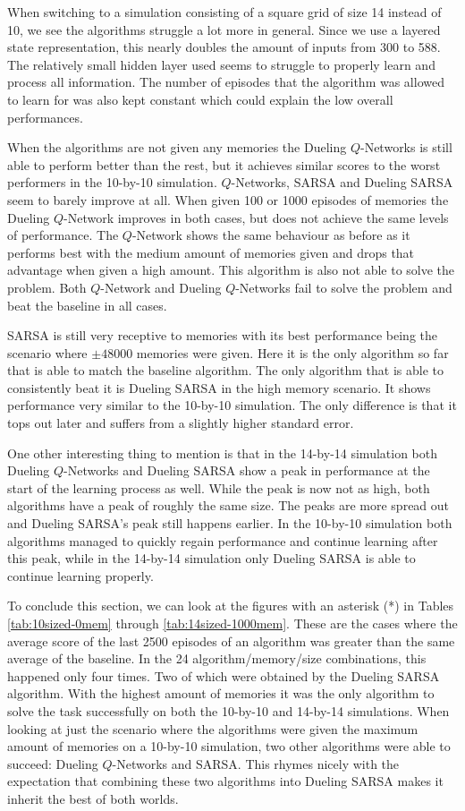 When switching to a simulation consisting of a square grid of size 14 instead of 10, we see the algorithms struggle a lot more in general. Since we use a layered state representation, this nearly doubles the amount of inputs from 300 to 588. The relatively small hidden layer used seems to struggle to properly learn and process all information. The number of episodes that the algorithm was allowed to learn for was also kept constant which could explain the low overall performances.

When the algorithms are not given any memories the Dueling $Q$-Networks is still able to perform better than the rest, but it achieves similar scores to the worst performers in the 10-by-10 simulation. $Q$-Networks, SARSA and Dueling SARSA seem to barely improve at all. When given 100 or 1000 episodes of memories the Dueling $Q$-Network improves in both cases, but does not achieve the same levels of performance. The $Q$-Network shows the same behaviour as before as it performs best with the medium amount of memories given and drops that advantage when given a high amount. This algorithm is also not able to solve the problem. Both $Q$-Network and Dueling $Q$-Networks fail to solve the problem and beat the baseline in all cases.

SARSA is still very receptive to memories with its best performance being the scenario where $\pm 48000$ memories were given. Here it is the only algorithm so far that is able to match the baseline algorithm. The only algorithm that is able to consistently beat it is Dueling SARSA in the high memory scenario. It shows performance very similar to the 10-by-10 simulation. The only difference is that it tops out later and suffers from a slightly higher standard error.

One other interesting thing to mention is that in the 14-by-14 simulation both Dueling $Q$-Networks and Dueling SARSA show a peak in performance at the start of the learning process as well. While the peak is now not as high, both algorithms have a peak of roughly the same size. The peaks are more spread out and Dueling SARSA's peak still happens earlier. In the 10-by-10 simulation both algorithms managed to quickly regain performance and continue learning after this peak, while in the 14-by-14 simulation only Dueling SARSA is able to continue learning properly.

To conclude this section, we can look at the figures with an asterisk (*) in Tables \ref{tab:10sized-0mem} through \ref{tab:14sized-1000mem}. These are the cases where the average score of the last 2500 episodes of an algorithm was greater than the same average of the baseline. In the 24 algorithm/memory/size combinations, this happened only four times. Two of which were obtained by the Dueling SARSA algorithm. With the highest amount of memories it was the only algorithm to solve the task successfully on both the 10-by-10 and 14-by-14 simulations. When looking at just the scenario where the algorithms were given the maximum amount of memories on a 10-by-10 simulation, two other algorithms were able to succeed: Dueling $Q$-Networks and SARSA. This rhymes nicely with the expectation that combining these two algorithms into Dueling SARSA makes it inherit the best of both worlds.
